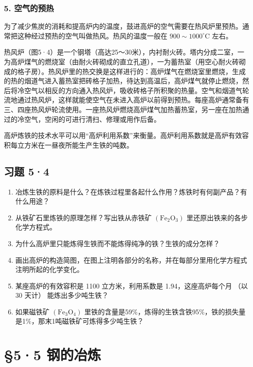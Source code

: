 \subsubsection{5. 空气的预热}

为了减少焦炭的消耗和提高炉内的温度，鼓进高炉的空气需要在热风炉里预热。通常把这种经过预热的空气叫做热风。热风的温度一般在
\(900 \sim 1000^{\circ} \mathrm{C}\) 左右。

热风炉（图5·4）是一个钢塔（高达25～30米），内衬耐火砖。塔内分成二室，一为高炉煤气的燃烧室（由耐火砖砌成的直立孔道），一为蓄热室（用空心耐火砖砌成的格子房）。热风炉里的热交换是这样进行的：高炉煤气在燃烧室里燃烧，生成的热的烟道气进入蓄热室把砖格子加热，待达到高温后，高炉煤气就停止燃烧，然后将冷空气以相反的方向通入热风炉，吸收砖格子所积聚的热量。空气和烟道气轮流地通过热风炉，这样就能使空气在未进入高炉以前得到预热。每座高炉通常备有三、四座热风炉轮流使用。一座热风炉燃烧高炉煤气加热蓄热室，另一座在加热通过的冷空气，空闲的可进行清扫、修理或用作后备。

高炉炼铁的技术水平可以用``高炉利用系数''来衡量。高炉利用系数就是高炉有效容积每立方米在一昼夜所能生产生铁的吨数。

\subsection{习题 5·4}

\begin{enumerate}
\item
  冶炼生铁的原料是什么？在炼铁过程里各起什么作用？炼铁时有何副产品？有什么用途？
\item
  从铁矿石里炼铁的原理怎样？写出铁从赤铁矿
  \(\left(\mathrm{Fe}_{2}\mathrm{O}_{3}\right)\)
  里还原出铁来的各步化学方程式。
\item
  为什么高炉里只能炼得生铁而不能炼得纯净的铁？生铁的成分怎样？
\item
  画出高炉的构造简图，在图上注明各部分的名称，并在每部分里用化学方程式注明所起的化学变化。
\item
  某座高炉的有效容积是 1100 立方米，利用系数是 1.94，这座高炉每个月 （以
  30 天计） 能炼出多少吨生铁？
\item
  如果磁铁矿 \(\left(\mathrm{Fe}_{3}\mathrm{O}_{4}\right)\)
  里铁的含量是59\%，炼得的生铁含铁95\%，铁的损失量是1\%，那末1吨磁铁矿可炼得多少吨生铁？
\end{enumerate}

\section{§5·5 钢的冶炼}

